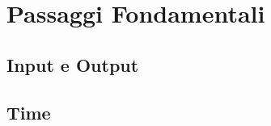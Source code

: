 \documentclass[../../main.tex]{subfiles}
\begin{document}
\section{Passaggi Fondamentali}

\subsection{Input e Output}
\subsection{Time}
\end{document}
